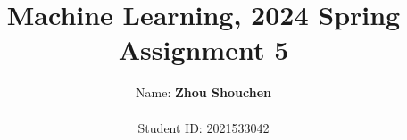 \documentclass{article}
\title{Machine Learning, 2024 Spring\\Assignment 5}
\begin{document}
\author{
    Name: \textbf{Zhou Shouchen} \\\\
	Student ID: 2021533042
}
\maketitle

\begin{abstract}

\end{abstract}
\newpage






\end{document}
